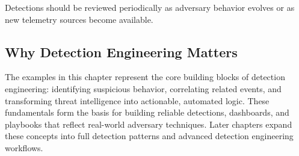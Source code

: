 Detections should be reviewed periodically as adversary behavior evolves or as new telemetry sources become available.


\subsection*{Why Detection Engineering Matters}

The examples in this chapter represent the core building blocks of detection engineering: identifying suspicious behavior, 
correlating related events, and transforming threat intelligence into actionable, automated logic. These fundamentals form 
the basis for building reliable detections, dashboards, and playbooks that reflect real-world adversary techniques. Later 
chapters expand these concepts into full detection patterns and advanced detection engineering workflows.
